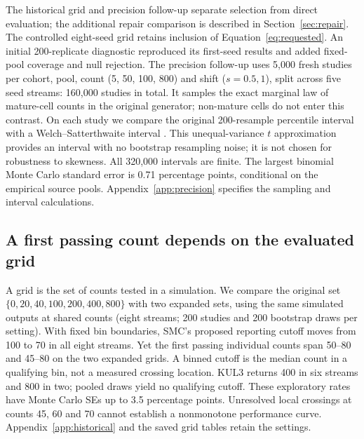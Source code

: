 The historical grid and precision follow-up separate selection from direct
evaluation; the additional repair comparison is described in
Section~\ref{sec:repair}.
The controlled eight-seed grid retains inclusion of
Equation~\ref{eq:requested}. An initial 200-replicate diagnostic reproduced
its first-seed results and added fixed-pool coverage and null rejection.
The precision follow-up uses 5{,}000 fresh studies per cohort, pool, count
(5, 50, 100, 800) and shift ($s=0.5,1$), split across five seed streams:
160{,}000 studies in total. It samples the exact marginal law of mature-cell
counts in the original generator; non-mature cells do not enter this contrast.
On each study we compare the original 200-resample percentile interval with a
Welch--Satterthwaite interval \citep{nistwelch}. This unequal-variance $t$ approximation provides an interval with no
bootstrap resampling noise; it is not chosen for robustness to skewness.
All 320{,}000 intervals are finite. The largest binomial Monte Carlo standard
error is 0.71 percentage points, conditional on the empirical source pools.
Appendix~\ref{app:precision} specifies the sampling and interval calculations.





\subsection{A first passing count depends on the evaluated grid}
A grid is the set of counts tested in a simulation. We compare the original
set $\{0,20,40,100,200,400,800\}$ with two expanded sets, using the same
simulated outputs at shared counts (eight streams; 200 studies and 200
bootstrap draws per setting). With fixed bin boundaries, SMC's proposed
reporting cutoff moves from 100 to 70 in all eight streams. Yet the first
passing individual counts span 50--80 and 45--80 on the two expanded grids.
A binned cutoff is the median count in a qualifying bin, not a measured
crossing location. KUL3 returns 400 in six streams and 800 in two; pooled
draws yield no qualifying cutoff. These exploratory rates have Monte Carlo
SEs up to 3.5 percentage points. Unresolved local crossings at counts
45, 60 and 70 cannot establish a nonmonotone performance curve.
Appendix~\ref{app:historical} and the saved grid tables retain the settings.

